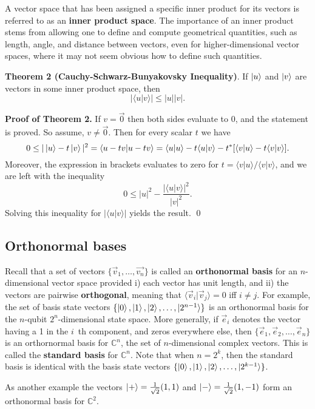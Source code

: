 \documentclass [12pt]{article}
\theoremstyle{definition}
\begin{document}
A vector space that has been assigned a specific inner product for its vectors is referred to as an \textbf{inner product space}. The importance of an inner product
stems from allowing one to define and compute geometrical quantities, such as length, angle, and distance between vectors, even for higher-dimensional vector spaces, where it 
may not seem obvious how to define such quantities.

\textbf{Theorem 2 (Cauchy-Schwarz-Bunyakovsky Inequality)}. If $\ket{u}$ and $\ket{v}$ are vectors in some inner product space, then
\[|\langle u|v\rangle| \leq |u||v|.\]


\textbf{Proof of Theorem 2.} If $v=\vec{0}$ then both sides evaluate to $0$, and the statement is proved. So assume, $v\not=\vec{0}$. Then for every scalar $t$ we 
have 
\[0 \leq |\ket{u}-t\ket{v}|^2 = \langle u-tv|u-tv\rangle = \langle u|u\rangle - t\langle u|v\rangle - t^*[\langle v|u \rangle-t\langle v|v\rangle].\]
Moreover, the expression in brackets evaluates to zero for $t=\langle v|u \rangle/\langle v|v\rangle$, and we are left with the inequality
\[0\leq |u|^2 - \frac{|\langle u|v\rangle|^2}{|v|^2}.\]
Solving this inequality for $|\langle u|v\rangle |$ yields the result. \qed

\subsection*{Orthonormal bases}

Recall that a set of vectors $\{\vec{v}_1,\ldots,\vec{v_n}\}$ is called an \textbf{orthonormal basis} for an $n$-dimensional vector space provided 
i) each vector has unit length, and ii) the vectors are pairwise \textbf{orthogonal}, meaning that $\langle\vec{v}_i|\vec{v}_j\rangle=0$ iff $i\not=j$. 
For example, the set of basis state vectors $\{\ket{0},\ket{1},\ket{2},\ldots,\ket{2^{n-1}}\}$ is an orthonormal basis
for the $n$-qubit $2^n$-dimensional state space. More generally, if $\vec{e}_i$ denotes the vector having a 1 in the $i$~th component, and zeros everywhere else,
then $\{\vec{e}_1,\vec{e}_2,\ldots,\vec{e}_n\}$ is an orthornormal basis for $\mathbb{C}^n$, the set of $n$-dimensional complex vectors. This is called the \textbf{standard basis}
for $\mathbb{C}^n$. Note that when $n=2^k$, then the standard basis is identical with the basis state vectors  $\{\ket{0},\ket{1},\ket{2},\ldots,\ket{2^{k-1}}\}$.

As another example the vectors $\ket{+} = \frac{1}{\sqrt{2}}(1,1)$ and $\ket{-}=\frac{1}{\sqrt{2}}(1,-1)$ form an orthonormal basis for $\mathbb{C}^2$.
\end{document}
